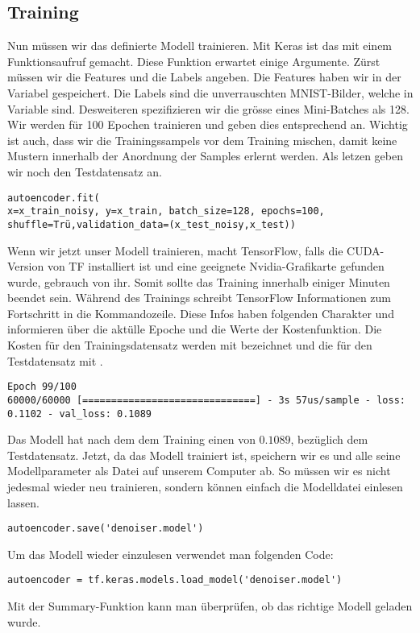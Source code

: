 \subsection{Training}
Nun müssen wir das definierte Modell trainieren.
Mit Keras ist das mit einem Funktionsaufruf gemacht. Diese Funktion erwartet
einige Argumente. Zürst müssen wir die Features und die Labels angeben. Die
Features haben wir in der Variabel  gespeichert. Die Labels
sind die unverrauschten MNIST-Bilder, welche in Variable  sind.
Desweiteren spezifizieren wir die grösse eines Mini-Batches als 128. Wir werden
für 100 Epochen trainieren und geben dies entsprechend an. Wichtig ist auch,
dass wir die Trainingssampels vor dem Training mischen, damit keine Mustern
innerhalb der Anordnung der Samples erlernt werden. Als letzen geben wir noch
den Testdatensatz an.
\begin{verbatim}
autoencoder.fit(
x=x_train_noisy, y=x_train, batch_size=128, epochs=100, shuffle=Trü,validation_data=(x_test_noisy,x_test))
\end{verbatim}
Wenn wir jetzt unser Modell trainieren, macht TensorFlow, falls die CUDA-Version
von TF installiert ist und eine geeignete
Nvidia-Grafikarte gefunden wurde, gebrauch von ihr. Somit sollte das Training
innerhalb einiger Minuten beendet sein.
Während des Trainings schreibt TensorFlow Informationen zum Fortschritt in die
Kommandozeile. Diese Infos haben folgenden Charakter und informieren über die aktülle Epoche und die
Werte der Kostenfunktion. Die Kosten für den Trainingsdatensatz werden mit
 bezeichnet und die für den Testdatensatz mit .
\begin{verbatim}
Epoch 99/100
60000/60000 [==============================] - 3s 57us/sample - loss: 0.1102 - val_loss: 0.1089
\end{verbatim}
Das Modell hat nach dem dem Training einen  von $0.1089$,
bezüglich dem Testdatensatz.
\para{}
Jetzt, da das Modell trainiert ist, speichern wir es und alle seine
Modellparameter als Datei auf unserem Computer ab.
So müssen wir es nicht jedesmal wieder neu trainieren, sondern können einfach
die Modelldatei einlesen lassen.
\begin{verbatim}
autoencoder.save('denoiser.model')
\end{verbatim}
Um das Modell wieder einzulesen verwendet man folgenden Code:
\begin{verbatim}
autoencoder = tf.keras.models.load_model('denoiser.model')
\end{verbatim}
Mit der Summary-Funktion kann man überprüfen, ob das richtige Modell geladen wurde.

